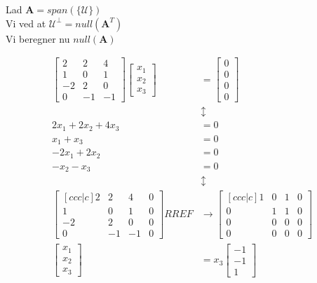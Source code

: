 \documentclass[12pt]{article}
\begin{document}
{Lad $ \textbf{A} = span(\mathcal{\{U}\})$ \\

Vi ved at $ \mathcal{U}^\perp  = null(\textbf{A}^T)$\\

Vi beregner nu $null (\textbf{A})$

\begin{align*} 
\begin{bmatrix}
2 & 2 & 4\\ 1 & 0 & 1 \\ -2 & 2 & 0 \\ 0 & -1 & -1
\end{bmatrix} 
\begin{bmatrix}
x_1 \\ x_2 \\ x_3
\end{bmatrix} &= 
\begin{bmatrix}
0 \\ 0 \\ 0 \\0
\end{bmatrix}\\
&\updownarrow \\
2x_1 + 2x_2 + 4x_3 &= 0 \\ 
x_1 + x_3 &= 0\\
 -2x_1 + 2x_2 &= 0\\ 
-x_2  -x_3 &= 0\\
&\updownarrow \\
\begin{bmatrix}[ccc|c]
2 & 2 & 4 & 0 \\ 1 & 0 & 1 & 0  \\ -2 & 2 & 0 & 0  \\ 0 & -1 & -1 & 0
\end{bmatrix}  {RREF} &\rightarrow 
\begin{bmatrix}[ccc|c]
1 & 0 & 1 & 0\\
0 & 1 & 1 & 0\\
0 & 0 & 0 & 0\\
0 & 0 & 0 & 0
\end{bmatrix}\\
\begin{bmatrix}
x_1\\x_2\\x_3
\end{bmatrix} &= x_3
\begin{bmatrix}-1 \\ -1 \\ 1 \end{bmatrix} \\\\

\end{align*}}
\end{document}
